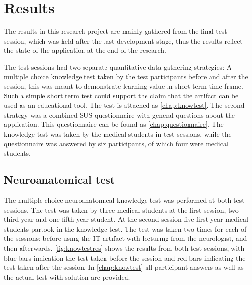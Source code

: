 


\chapter{Results}\label{chap:results}




The results in this research project are mainly gathered from the final test session, which was held after the last development stage, thus the results reflect the state of the application at the end of the research. 

The test sessions had two separate quantitative data gathering strategies: 
A multiple choice knowledge test taken by the test participants before and after the session,  this was meant to demonstrate learning value in short term time frame. Such a simple short term test could support the claim that the artifact can be used as an educational tool. The test is attached as \autoref{chap:knowtest}.
The second strategy was a combined SUS questionnaire with general questions about the application. This questionnaire can be found as \autoref{chap:questionnaire}.
The knowledge test was taken by the medical students in test sessions, while the questionnaire was answered by six participants, of which four were medical students.


\section{Neuroanatomical test}
The multiple choice neuroanatomical knowledge test was performed at both test sessions. The test was taken by three medical students at the first session, two third year and one fifth year student. At the second session five first year medical students partook in the knowledge test. The test was taken two times for each of the sessions; before using the IT artifact with lecturing from the neurologist, and then afterwards. \autoref{fig:knowtestres} shows the results from both test sessions, with blue bars indication the test taken before the session and red bars indicating the test taken after the session. In \autoref{chap:knowtest} all participant answers as well as the actual test with solution are provided.

